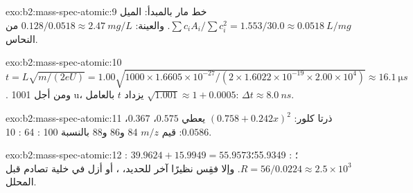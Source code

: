 \begin{solution}{exo:b2:mass-spec-atomic:9}
خط مار بالمبدأ: الميل $\sum c_iA_i/\sum c_i^2 = 1.553/30.0 \approx \qty{0.0518}{L/mg}$. والعينة:
$0.128/0.0518 \approx \qty{2.47}{mg/L}$ من النحاس.
\end{solution}

\begin{solution}{exo:b2:mass-spec-atomic:10}
$t = L\sqrt{m/(2eU)} = 1.00\sqrt{1000 \times 1.6605 \times 10^{-27}/(2 \times 1.6022 \times 10^{-19}
\times 2.00 \times 10^4)} \approx \qty{16.1}{\micro s}$. ومن أجل 1001 u، يزداد $t$ بالعامل
$\sqrt{1.001} \approx 1 + 0.0005$: $\Delta t \approx \qty{8.0}{ns}$.
\end{solution}

\begin{solution}{exo:b2:mass-spec-atomic:11}
ذرتا كلور: $(0.758 + 0.242x)^2$ يعطي $0.575$، $0.367$، $0.0586$: قيم $m/z$ 84 و86 و88 بالنسبة
100 : 64 : 10.
\end{solution}

\begin{solution}{exo:b2:mass-spec-atomic:12}
: $39.9624 + 15.9949 = 55.9573$؛ : 55.9349؛ $R = 56/0.0224 \approx 2.5 \times
10^3$. وإلا فقِس نظيرًا آخر للحديد، ، أو أزل  في خلية تصادم
قبل المحلل.
\end{solution}

